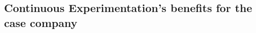 \documentclass[english]{tktltiki2}
\theoremstyle{definition}
\theoremstyle{remark}
\begin{document}




\subsection{Continuous Experimentation's benefits for the case company}



\end{document}
